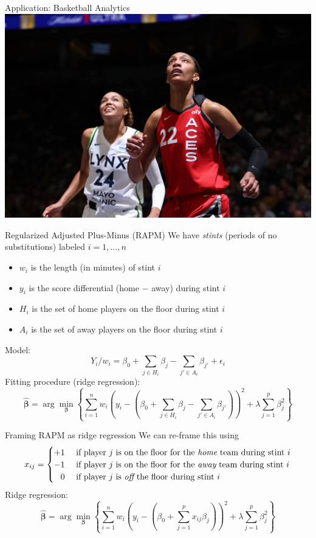 \documentclass{beamer}
\begin{document}
  \begin{frame}{Application: Basketball Analytics}
    \includegraphics[width = \textwidth]{images/wilson_collier.jpg}
  \end{frame}

  \begin{frame}{Regularized Adjusted Plus-Minus (RAPM)}
    We have {\it stints} (periods of no substitutions) labeled $i = 1, ..., n$
    \begin{itemize}
      \item $w_i$ is the length (in minutes) of stint $i$
      \item $y_i$ is the score differential (home $-$ away) during stint $i$
      \item $H_i$ is the set of home players on the floor during stint $i$
      \item $A_i$ is the set of away players on the floor during stint $i$
    \end{itemize}
    Model:
    $$
      Y_i / w_i = \beta_0 + \sum_{j \in H_i} \beta_j - \sum_{j' \in A_i} \beta_{j'} + \epsilon_i
    $$
    Fitting procedure (ridge regression):
    $$
      \boldsymbol{\hat\beta} = \arg\min_{\boldsymbol{\beta}} \left\{
        \sum_{i=1}^n w_i \left(y_i - \left(\beta_0 + \sum_{j \in H_i}\beta_j - \sum_{j' \in A_i}\beta_{j'}\right)\right)^2 + \lambda \sum_{j = 1}^p \beta_j^2
      \right\}
    $$
  \end{frame}

  \begin{frame}{Framing RAPM as ridge regression}
    We can re-frame this using
    $$
      x_{ij} = \begin{cases}
        +1        & \mbox{ if player $j$ is on the floor for the {\it home} team during stint $i$}\\
        -1        & \mbox{ if player $j$ is on the floor for the {\it away} team during stint $i$}\\
        \hfill 0  & \mbox{ if player $j$ is {\it off} the floor during stint $i$}
      \end{cases}
    $$
    Ridge regression:
    $$
      \boldsymbol{\hat\beta} = \arg\min_{\boldsymbol{\beta}} \left\{
        \sum_{i=1}^n w_i \left(y_i - \left(\beta_0 + \sum_{j = 1}^p x_{ij}\beta_j\right)\right)^2 + \lambda \sum_{j = 1}^p \beta_j^2
      \right\}
    $$
  \end{frame}
\end{document}
